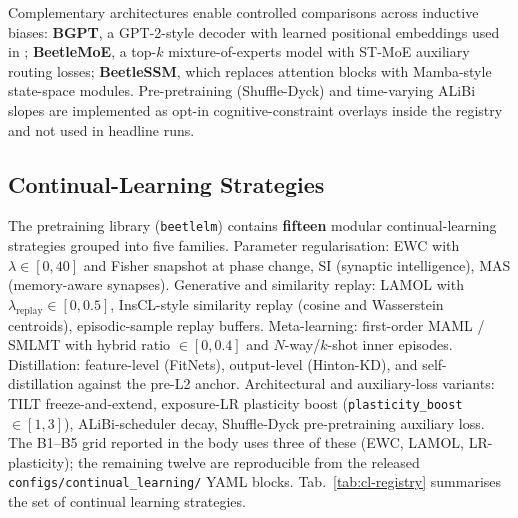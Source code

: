 Complementary architectures enable controlled comparisons across inductive biases: \textbf{BGPT}, a GPT-2-style decoder with learned positional embeddings used in \citet{arnett-etal-2025-acquisition}; \textbf{BeetleMoE}, a top-$k$ mixture-of-experts model with ST-MoE auxiliary routing losses; \textbf{BeetleSSM}, which replaces attention blocks with Mamba-style state-space modules. Pre-pretraining (Shuffle-Dyck) and time-varying ALiBi slopes are implemented as opt-in cognitive-constraint overlays inside the registry and not used in headline runs.

\subsection{Continual-Learning Strategies}\label{sec:cl-strategies}

The \beetle{} pretraining library (\texttt{beetlelm}) contains  \textbf{fifteen} modular continual-learning strategies grouped into five families. Parameter regularisation: EWC \citep{kirkpatrick2017overcoming} with $\lambda\in[0,40]$ and Fisher snapshot at phase change, SI (synaptic intelligence), MAS (memory-aware synapses). Generative and similarity replay: LAMOL \citep{sun2020lamol} with $\lambda_{\text{replay}}\in[0,0.5]$, InsCL-style similarity replay (cosine and Wasserstein centroids), episodic-sample replay buffers. Meta-learning: first-order MAML / SMLMT \citep{bansal-etal-2020-self,africa-etal-2025-learning,africa-etal-2025-meta} with hybrid ratio $\in[0,0.4]$ and $N$-way/$k$-shot inner episodes. Distillation: feature-level (FitNets), output-level (Hinton-KD), and self-distillation against the pre-L2 anchor. Architectural and auxiliary-loss variants: TILT freeze-and-extend, exposure-LR plasticity boost (\texttt{plasticity\_boost}$\in[1,3]$), ALiBi-scheduler decay, Shuffle-Dyck pre-pretraining auxiliary loss. The B1--B5 grid reported in the body uses three of these (EWC, LAMOL, LR-plasticity); the remaining twelve are reproducible from the released \texttt{configs/continual\_learning/} YAML blocks. Tab.~\ref{tab:cl-registry} summarises the set of continual learning strategies.

